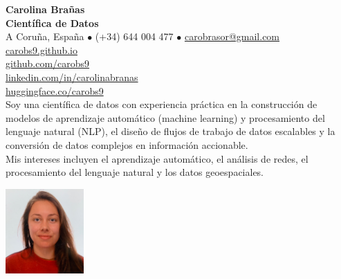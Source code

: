 \documentclass{resume}
\begin{document}
\vspace*{-3.5em}

\begin{minipage}[t]{0.72\textwidth}
    \raggedright
    {\Huge \textbf{Carolina Brañas}}\\[0.4em]
    {\normalsize \textbf{Científica de Datos}}\\[0.8em]
    {\small
    A Coruña, España $\bullet$
    (+34) 644 004 477 $\bullet$
    \href{mailto:carobrasor@gmail.com}{carobrasor@gmail.com} \\[0.25em]
    \href{https://carobs9.github.io/}{carobs9.github.io} \\[0.25em]
    \href{https://github.com/carobs9}{github.com/carobs9} \\[0.25em]
    \href{https://www.linkedin.com/in/carolinabranas/}{linkedin.com/in/carolinabranas} \\[0.25em]
    \href{https://huggingface.co/carobs9}{huggingface.co/carobs9}
    }\\[1em]

    {\small
    Soy una científica de datos con experiencia práctica en la construcción de modelos de aprendizaje automático (machine learning) y procesamiento del lenguaje natural (NLP), el diseño de flujos de trabajo de datos escalables y la conversión de datos complejos en información accionable. \\[0.25em]
    Mis intereses incluyen el aprendizaje automático, el análisis de redes, el procesamiento del lenguaje natural y los datos geoespaciales. 
    }
\end{minipage}%
\hfill
\begin{minipage}[t]{0.23\textwidth}
    \vspace*{0.3em}  %
    \begin{flushright}
        \includegraphics[width=3cm,clip,trim=0 0 0 0]{profile.jpg}
    \end{flushright}
\end{minipage}

\end{document}
